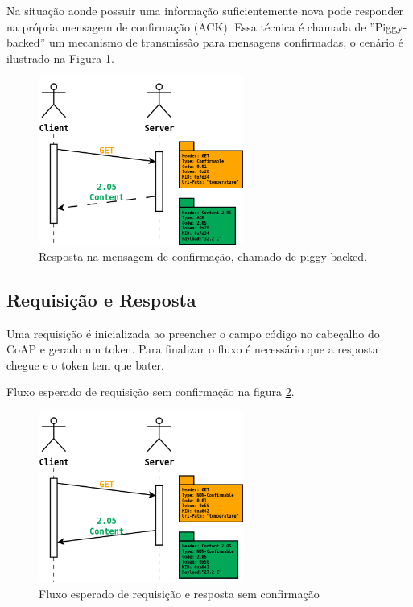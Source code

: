 Na situa\c{c}\~ao aonde possuir uma informa\c{c}\~ao suficientemente nova pode responder na pr\'opria mensagem de confirma\c{c}\~ao (ACK). Essa t\'ecnica \'e chamada de ''Piggy-backed'' um mecanismo de transmiss\~ao para mensagens confirmadas, o cen\'ario \'e ilustrado na Figura \ref{piggyBacked}.\cite{draft-ietf-core-coap-18}
\begin{figure}[h]
   \label{piggyBacked}
   \centering
   \includegraphics[width=0.6\textwidth]{figuras/piggybacked.png}
   \caption{Resposta na mensagem de confirma\c{c}\~ao, chamado de piggy-backed.}
\end{figure}

\subsection{Requisi\c{c}\~ao e Resposta}

Uma requisi\c{c}\~ao \'e inicializada ao preencher o campo c\'odigo no cabe\c{c}alho do CoAP e gerado um token.
Para finalizar o fluxo \'e necess\'ario que a resposta chegue e o token tem que bater.


Fluxo esperado de requisi\c{c}\~ao sem confirma\c{c}\~ao na figura \ref{nonConfirmable}.
\begin{figure}[h]
   \label{nonConfirmable}
   \centering
   \includegraphics[width=0.6\textwidth]{figuras/nonconfirmable.png}
   \caption{Fluxo esperado de requisi\c{c}\~ao e resposta sem confirma\c{c}\~ao}
\end{figure}

